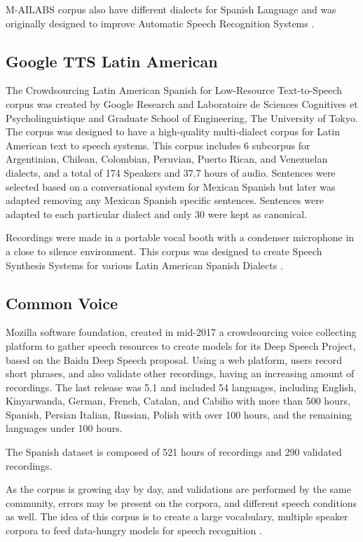 \documentclass[10pt, a4paper]{article}
\begin{document}
M-AILABS corpus also have different dialects for Spanish Language and was originally designed to improve Automatic Speech Recognition Systems \cite{M-AILABS}.

\subsection{Google TTS Latin American}

The Crowdsourcing Latin American Spanish for Low-Resource Text-to-Speech corpus was created by Google Research and Laboratoire de Sciences Cognitives et Psycholinguistique and Graduate School of Engineering, The University of Tokyo. The corpus was designed to have a high-quality multi-dialect corpus for Latin American text to speech systems. This corpus includes 6 subcorpus for Argentinian, Chilean, Colombian, Peruvian, Puerto Rican, and Venezuelan dialects, and a total of 174 Speakers and 37.7 hours of audio. Sentences were selected based on a conversational system for Mexican Spanish but later was adapted removing any Mexican Spanish specific sentences. Sentences were adapted to each particular dialect and only 30 were kept as canonical.

Recordings were made in a portable vocal booth with a condenser microphone in a close to silence environment. This corpus was designed to create Speech Synthesis Systems for various Latin American Spanish Dialects \cite{googleTTSLatinAmericanSpanishCorpus}.


\subsection{Common Voice}

Mozilla software foundation, created in mid-2017 a crowdsourcing voice collecting platform to gather speech resources to create models for its Deep Speech Project, based on the Baidu Deep Speech \cite{deepspeeh} proposal. Using a web platform, users record short phrases, and also validate other recordings, having an increasing amount of recordings. The last release was 5.1 and included  54 languages, including English, Kinyarwanda, German, French, Catalan, and Cabilio with more than 500 hours, Spanish, Persian Italian, Russian, Polish with over 100 hours, and the remaining languages under 100 hours.

The Spanish dataset is composed of 521 hours of recordings and 290 validated recordings.

As the corpus is growing day by day, and validations are performed by the same community, errors may be present on the corpora, and different speech conditions as well. The idea of this corpus is to create a large vocabulary, multiple speaker corpora to feed data-hungry models for speech recognition \cite{Common-Voice}.
\end{document}
